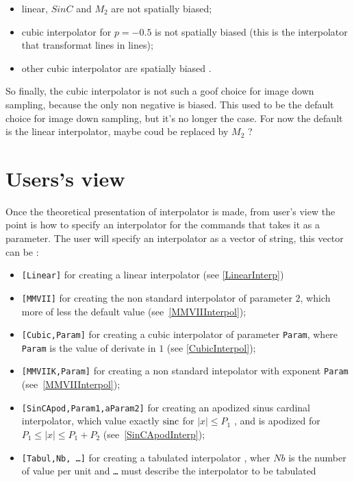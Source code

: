 \begin{itemize}
    \item  linear, $SinC$ and   $M_2$  are not spatially biased;

    \item  cubic interpolator for $p=-0.5$ is not spatially biased (this is the interpolator that
           transformat lines in lines);

    \item  other cubic interpolator are spatially biased .
\end{itemize}

So finally, the cubic interpolator is not such a goof choice for image down sampling, 
because the only  non negative  is biased.  This used to be the default choice for
image down sampling, but it's no longer the case. For now the default is the linear
interpolator, maybe coud be replaced by $M_2$ ?



\section{Users's view}

\label{InterpUserView}

Once the theoretical presentation of interpolator is made, from user's view the point is
how to specify an interpolator for the commands that takes it as a parameter.
The user will specify an interpolator as a  vector of string, this vector can be :

\begin{itemize}
    \item {\tt [Linear]}  for creating a linear interpolator (see \ref{LinearInterp})
    \item {\tt [MMVII]}  for creating the non standard interpolator of parameter $2$, which more of less the default value 
                         (see~\ref{MMVIIInterpol});
    \item {\tt [Cubic,Param]} for creating a cubic interpolator of parameter {\tt Param}, where {\tt Param} is the value
          of derivate in $1$ (see  \ref{CubicInterpol});
    \item {\tt [MMVIIK,Param]} for creating a non standard intepolator with exponent {\tt Param} 
                         (see~\ref{MMVIIInterpol});
    \item {\tt [SinCApod,Param1,aParam2]}  for creating an apodized sinus cardinal interpolator, which value exactly
         $\operatorname{sinc}$ for    $ |x| \leq P_1$  , and is apodized for   $ P_1\leq |x| \leq P_1+P_2$
                         (see~\ref{SinCApodInterp});
    \item {\tt [Tabul,Nb, \dots ]} for creating a tabulated interpolator , wher  $Nb$ is the number of value per unit  
          and {\tt \dots} must describe the interpolator to be tabulated
\end{itemize}

